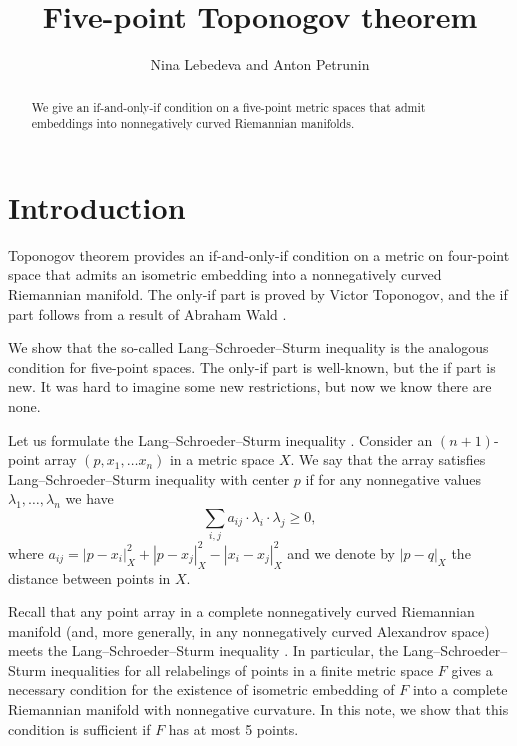\documentclass{article}
\begin{document}


\title{Five-point Toponogov theorem}
\author{Nina Lebedeva and Anton Petrunin}

\date{}
\maketitle
\begin{abstract}
We give an if-and-only-if condition on a five-point metric spaces that admit embeddings into nonnegatively curved Riemannian manifolds.
\end{abstract}


\section{Introduction}

Toponogov theorem provides an if-and-only-if condition on a metric on four-point space that admits an isometric embedding into a nonnegatively curved Riemannian manifold.
The only-if part is proved by Victor Toponogov, and the if part follows from a result of Abraham Wald \cite[\S 7]{wald}.

We show that the so-called Lang--Schroeder--Sturm inequality is the analogous condition for five-point spaces.
The only-if part is well-known, but the if part is new.
It was hard to imagine some new restrictions, but now we know there are none.

Let us formulate the Lang--Schroeder--Sturm inequality \cite{lang-schroeder, sturm}.
Consider an $(n+1)$-point array $(p,x_1,\dots x_n)$ in a metric space $X$.
We say that the array satisfies Lang--Schroeder--Sturm inequality with center $p$
if for any nonnegative values $\lambda_1,\dots,\lambda_n$ we have
\[\sum_{i,j}a_{ij}\cdot \lambda_i\cdot\lambda_j\ge 0,\]
where $a_{ij}=|p-x_i|_X^2+|p-x_j|_X^2-|x_i-x_j|_X^2$
and we denote by $|p-q|_X$ the distance between points in $X$.

Recall that any point array in a  complete nonnegatively curved Riemannian manifold (and, more generally, in any nonnegatively curved Alexandrov space) meets the Lang--Schroeder--Sturm inequality \cite{lang-schroeder, sturm}.
In particular, 
the Lang--Schroeder--Sturm inequalities for all relabelings of points in a finite metric space $F$
gives a necessary condition for the existence of isometric embedding of $F$ into a complete Riemannian manifold with nonnegative curvature.
In this note, we show that this condition is sufficient if $F$ has at most 5 points.
\end{document}

